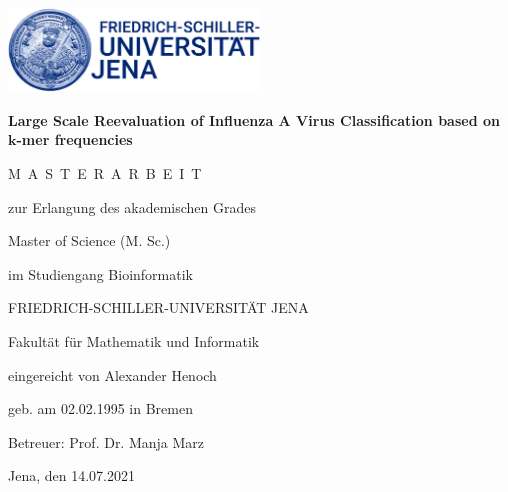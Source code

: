 \begin{titlepage}
    
    \centering 
    \large
    \includegraphics[width=0.5\textwidth]{Graphics/Logo.jpg}

    \vspace{5em}

    {\Large \textbf{Large Scale Reevaluation of Influenza A Virus Classification based on $\bm{k}$-mer frequencies}}
    
    \vspace{5em}
    
    M~A~S~T~E~R~A~R~B~E~I~T
    
    \vspace{1em}
    
    zur Erlangung des akademischen Grades
    
    \vspace{1em}
    
    Master of Science (M. Sc.)
    
    im Studiengang Bioinformatik
    
    \vspace{1em}
    
    FRIEDRICH-SCHILLER-UNIVERSITÄT JENA
    
    Fakultät für Mathematik und Informatik
    
    \vfill
    
    eingereicht von Alexander Henoch
    
    geb. am 02.02.1995 in Bremen
    
    \vspace{1em}
    
    Betreuer: Prof. Dr. Manja Marz
    
    \vspace{1em}
    
    Jena, den 14.07.2021
    
\end{titlepage}